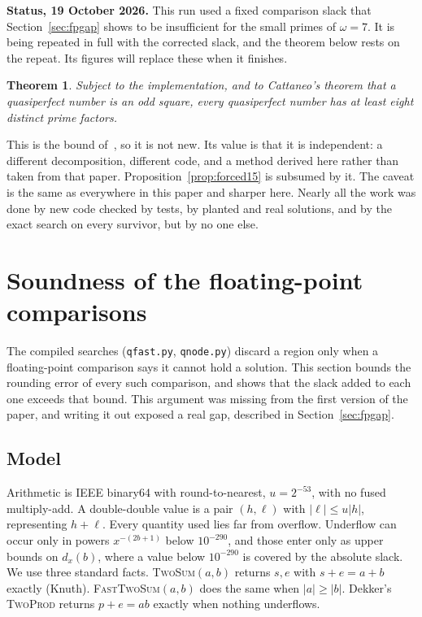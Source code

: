 \documentclass[11pt]{amsart}
\newtheorem{theorem}{Theorem}
\theoremstyle{remark}
\begin{document}
\textbf{Status, 19 October 2026.} This run used a fixed comparison slack that
Section~\ref{sec:fpgap} shows to be insufficient for the small primes of
$\omega = 7$. It is being repeated in full with the corrected slack, and the
theorem below rests on the repeat. Its figures will replace these when it
finishes.

\begin{theorem}\label{thm:omega8}
Subject to the implementation, and to Cattaneo's theorem that a quasiperfect
number is an odd square, every quasiperfect number has at least eight distinct
prime factors.
\end{theorem}

This is the bound of~\cite{tty}, so it is not new. Its value is that it is
independent: a different decomposition, different code, and a method derived here
rather than taken from that paper. Proposition~\ref{prop:forced15} is subsumed by
it. The caveat is the same as everywhere in this paper and sharper here. Nearly
all the work was done by new code checked by tests, by planted and real
solutions, and by the exact search on every survivor, but by no one else.

\section{Soundness of the floating-point comparisons}\label{sec:fpsound}
The compiled searches (\texttt{qfast.py}, \texttt{qnode.py}) discard a region
only when a floating-point comparison says it cannot hold a solution. This
section bounds the rounding error of every such comparison, and shows that the
slack added to each one exceeds that bound. This argument was missing from the
first version of the paper, and writing it out exposed a real gap, described in
Section~\ref{sec:fpgap}.

\subsection{Model}
Arithmetic is IEEE binary64 with round-to-nearest, $u = 2^{-53}$, with no fused
multiply-add. A double-double value is a pair $(h, \ell)$ with $|\ell| \le u|h|$,
representing $h + \ell$. Every quantity used lies far from overflow. Underflow
can occur only in powers $x^{-(2b+1)}$ below $10^{-290}$, and those enter only as
upper bounds on $d_x(b)$, where a value below $10^{-290}$ is covered by the
absolute slack. We use three standard facts. \textsc{TwoSum}$(a, b)$ returns
$s, e$ with $s + e = a + b$ exactly (Knuth). \textsc{FastTwoSum}$(a, b)$ does the
same when $|a| \ge |b|$. Dekker's \textsc{TwoProd} returns $p + e = ab$ exactly
when nothing underflows.
\end{document}
